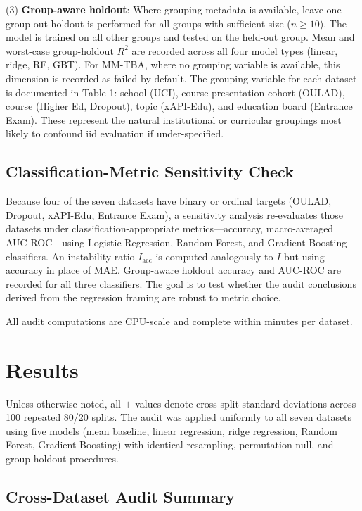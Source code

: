 \documentclass[10pt,letterpaper]{article}
\begin{document}
(3) \textbf{Group-aware holdout}: Where grouping metadata is available, leave-one-group-out holdout is performed for all groups with sufficient size ($n \geq 10$). The model is trained on all other groups and tested on the held-out group. Mean and worst-case group-holdout $R^2$ are recorded across all four model types (linear, ridge, RF, GBT). For MM-TBA, where no grouping variable is available, this dimension is recorded as failed by default. The grouping variable for each dataset is documented in Table 1: school (UCI), course-presentation cohort (OULAD), course (Higher Ed, Dropout), topic (xAPI-Edu), and education board (Entrance Exam). These represent the natural institutional or curricular groupings most likely to confound iid evaluation if under-specified.

\subsection{Classification-Metric Sensitivity Check}
Because four of the seven datasets have binary or ordinal targets (OULAD, Dropout, xAPI-Edu, Entrance Exam), a sensitivity analysis re-evaluates those datasets under classification-appropriate metrics---accuracy, macro-averaged AUC-ROC---using Logistic Regression, Random Forest, and Gradient Boosting classifiers. An instability ratio $I_{\mathrm{acc}}$ is computed analogously to $I$ but using accuracy in place of MAE. Group-aware holdout accuracy and AUC-ROC are recorded for all three classifiers. The goal is to test whether the audit conclusions derived from the regression framing are robust to metric choice.

All audit computations are CPU-scale and complete within minutes per dataset.

\section{Results}

Unless otherwise noted, all $\pm$ values denote cross-split standard deviations across 100 repeated 80/20 splits. The audit was applied uniformly to all seven datasets using five models (mean baseline, linear regression, ridge regression, Random Forest, Gradient Boosting) with identical resampling, permutation-null, and group-holdout procedures.

\subsection{Cross-Dataset Audit Summary}
\end{document}
